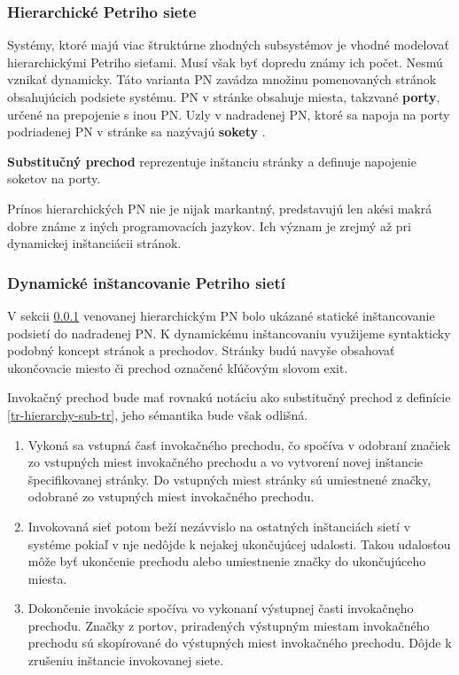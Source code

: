 \subsubsection{Hierarchické Petriho siete}

\label{tr-hierarchyPN}
Systémy, ktoré majú viac štruktúrne zhodných subsystémov je vhodné modelovať hierarchickými Petriho sieťami. Musí však byť dopredu známy ich počet. Nesmú vznikať dynamicky. Táto varianta PN zavádza množinu pomenovaných stránok obsahujúcich podsiete systému. PN v stránke obsahuje miesta, takzvané \textbf{porty}, určené na prepojenie s inou PN. Uzly v nadradenej PN, ktoré sa napoja na porty podriadenej PN v stránke sa nazývajú \textbf{sokety} \cite{rozenberg1991advances}.

\begin{defn}
	\label{tr-hierarchy-sub-tr}
	\textbf{Substitučný prechod} reprezentuje inštanciu stránky a definuje napojenie soketov na porty.
\end{defn}

\begin{note}
	Prínos hierarchických PN nie je nijak markantný, predstavujú len akési makrá dobre známe z iných programovacích jazykov. Ich význam je zrejmý až pri dynamickej inštanciácii stránok.
\end{note}

\subsubsection{Dynamické inštancovanie Petriho sietí}

V sekcii \ref{tr-hierarchyPN} venovanej hierarchickým PN bolo ukázané statické inštancovanie podsietí do nadradenej PN. K dynamickému inštancovaniu využijeme syntakticky podobný koncept stránok a prechodov. Stránky budú navyše obsahovať ukončovacie miesto či prechod označené kľúčovým slovom exit.

\begin{defn}
	Invokačný prechod bude mať rovnakú notáciu ako substitučný prechod z definície \ref{tr-hierarchy-sub-tr}, jeho sémantika bude však odlišná.
	
	\begin{enumerate}
		\item Vykoná sa vstupná časť invokačného prechodu, čo spočíva v odobraní značiek zo vstupných miest invokačného prechodu a vo vytvorení novej inštancie špecifikovanej stránky. Do vstupných miest stránky sú umiestnené značky, odobrané zo vstupných miest invokačného prechodu.
		\item Invokovaná sieť potom beží nezávvislo na ostatných inštanciách sietí v systéme pokiaľ v nje nedôjde k nejakej ukončujúcej udalosti. Takou udalosťou môže byť ukončenie prechodu alebo umiestnenie značky do ukončujúceho miesta.
		\item Dokončenie invokácie spočíva vo vykonaní výstupnej časti invokačnęho prechodu. Značky z portov, priradených výstupným miestam invokačného prechodu sú skopírované do výstupných miest invokačného prechodu. Dôjde k zrušeniu inštancie invokovanej siete.
	\end{enumerate}
\end{defn}

